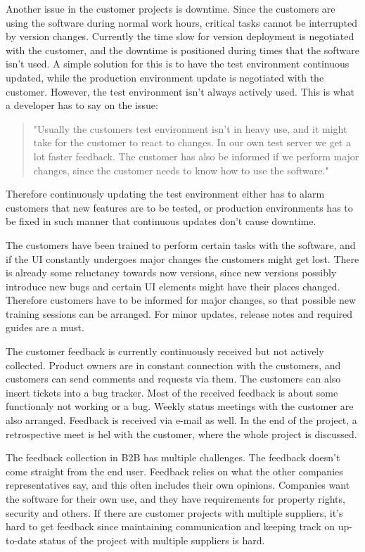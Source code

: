 \documentclass[english]{tktltiki2}
\theoremstyle{definition}
\theoremstyle{remark}
\begin{document}
Another issue in the customer projects is downtime. Since the customers are using the software during normal work hours, critical tasks cannot be interrupted by version changes. Currently the time slow for version deployment is negotiated with the customer, and the downtime is positioned during times that the software isn't used. A simple solution for this is to have the test environment continuous updated, while the production environment update is negotiated with the customer. However, the test environment isn't always actively used. This is what a developer has to say on the issue:

\begin{quote}
"Usually the customers test environment isn't in heavy use, and it might take for the customer to react to changes. In our own test server we get a lot faster feedback. The customer has also be informed if we perform major changes, since the customer needs to know how to use the software."
\end{quote}

Therefore continuously updating the test environment either has to alarm customers that new features are to be tested, or production environments has to be fixed in such manner that continuous updates don't cause downtime.

The customers have been trained to perform certain tasks with the software, and if the UI constantly undergoes major changes the customers might get lost. There is already some reluctancy towards now versions, since new versions possibly introduce new bugs and certain UI elements might have their places changed. Therefore customers have to be informed for major changes, so that possible new training sessions can be arranged. For minor updates, release notes and required guides are a must.

The customer feedback is currently continuously received but not actively collected. Product owners are in constant connection with the customers, and customers can send comments and requests via them. The customers can also insert tickets into a bug tracker. Most of the received feedback is about some functionaly not working or a bug. Weekly status meetings with the customer are also arranged. Feedback is received via e-mail as well. In the end of the project, a retrospective meet is hel with the customer, where the whole project is discussed.  

The feedback collection in B2B has multiple challenges. The feedback doesn't come straight from the end user. Feedback relies on what the other companies representatives say, and this often includes their own opinions. Companies want the software for their own use, and they have requirements for property rights, security and others. If there are customer projects with multiple suppliers, it's hard to get feedback since maintaining communication and keeping track on up-to-date status of the project with multiple suppliers is hard.
\end{document}
